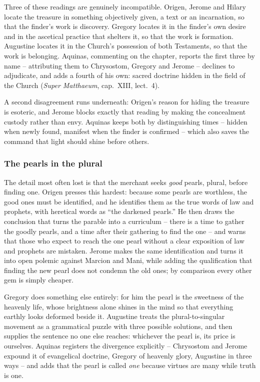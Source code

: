 Three of these readings are genuinely incompatible. Origen, Jerome and Hilary locate the treasure in something objectively given, a text or an incarnation, so that the finder's work is discovery. Gregory locates it in the finder's own desire and in the ascetical practice that shelters it, so that the work is formation. Augustine locates it in the Church's possession of both Testaments, so that the work is belonging. Aquinas, commenting on the chapter, reports the first three by name -- attributing them to Chrysostom, Gregory and Jerome -- declines to adjudicate, and adds a fourth of his own: sacred doctrine hidden in the field of the Church (\emph{Super Matthaeum}, cap.~XIII, lect.~4).

A second disagreement runs underneath: Origen's reason for hiding the treasure is esoteric, and Jerome blocks exactly that reading by making the concealment custody rather than envy. Aquinas keeps both by distinguishing times -- hidden when newly found, manifest when the finder is confirmed -- which also saves the command that light should shine before others.

\subsubsection*{The pearls in the plural}

The detail most often lost is that the merchant seeks \emph{good} pearls, plural, before finding one. Origen presses this hardest: because some pearls are worthless, the good ones must be identified, and he identifies them as the true words of law and prophets, with heretical words as ``the darkened pearls.'' He then draws the conclusion that turns the parable into a curriculum -- there is a time to gather the goodly pearls, and a time after their gathering to find the one -- and warns that those who expect to reach the one pearl without a clear exposition of law and prophets are mistaken. Jerome makes the same identification and turns it into open polemic against Marcion and Mani, while adding the qualification that finding the new pearl does not condemn the old ones; by comparison every other gem is simply cheaper.

Gregory does something else entirely: for him the pearl is the sweetness of the heavenly life, whose brightness alone shines in the mind so that everything earthly looks deformed beside it. Augustine treats the plural-to-singular movement as a grammatical puzzle with three possible solutions, and then supplies the sentence no one else reaches: whichever the pearl is, its price is ourselves. Aquinas registers the divergence explicitly -- Chrysostom and Jerome expound it of evangelical doctrine, Gregory of heavenly glory, Augustine in three ways -- and adds that the pearl is called \emph{one} because virtues are many while truth is one.

